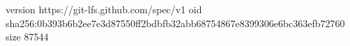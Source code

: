 version https://git-lfs.github.com/spec/v1
oid sha256:0b393b6b2ee7e3d87550ff2bdbfb32abb68754867e8399306e6bc363efb72760
size 87544
